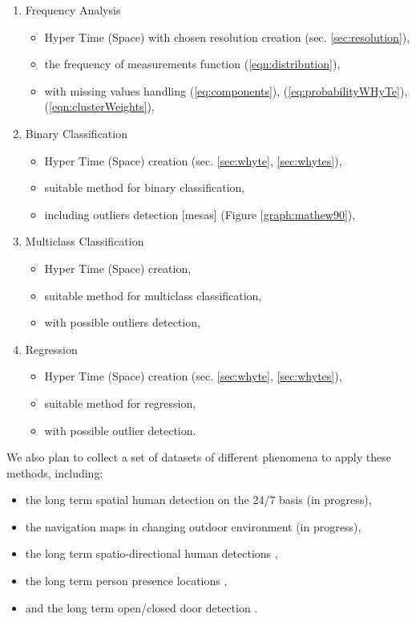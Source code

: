 \begin{enumerate}
    \item Frequency Analysis
    \begin{itemize}
        \item Hyper Time (Space) with chosen resolution creation (sec. \ref{sec:resolution}),
        \item the frequency of measurements function (\ref{eqn:distribution}),
        \item with missing values handling (\ref{eq:components}), (\ref{eq:probabilityWHyTe}), (\ref{eqn:clusterWeights}),
    \end{itemize}
    \item Binary Classification
    \begin{itemize}
        \item Hyper Time (Space) creation (sec. \ref{sec:whyte}, \ref{sec:whytes}),
        \item suitable method for binary classification,
        \item including outliers detection [mesas] (Figure \ref{graph:mathew90}),
    \end{itemize}
    \item Multiclass Classification
    \begin{itemize}
        \item Hyper Time (Space) creation,
        \item suitable method for multiclass classification,
        \item with possible outliers detection,
    \end{itemize}
    \item Regression
    \begin{itemize}
        \item Hyper Time (Space) creation (sec. \ref{sec:whyte}, \ref{sec:whytes}),
        \item suitable method for regression,
        \item with possible outlier detection.
    \end{itemize}
\end{enumerate}

We also plan to collect a set of datasets of different phenomena to apply these methods, including:
\begin{itemize}
    \item the long term spatial human detection on the 24/7 basis (in progress),
    \item the navigation maps in changing outdoor environment (in progress),
    \item the long term spatio-directional human detections \cite{brvscic2013person},
    \item the long term person presence locations \cite{krajnik2015s},
    \item and the long term open/closed door detection \cite{krajnik2014long}.
\end{itemize} 
    
        


